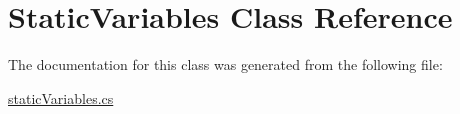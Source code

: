 \hypertarget{class_static_variables}{}\section{Static\+Variables Class Reference}
\label{class_static_variables}


The documentation for this class was generated from the following file\+:\begin{DoxyCompactItemize}
\item 
\mbox{\hyperlink{static_variables_8cs}{static\+Variables.\+cs}}\end{DoxyCompactItemize}
